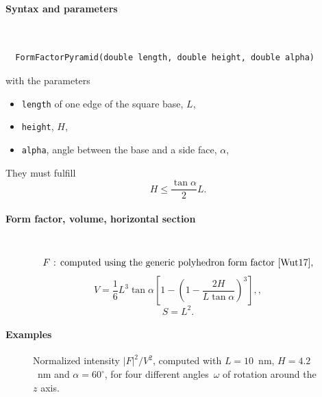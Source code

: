 \paragraph{Syntax and parameters}\strut\\[-2ex plus .2ex minus .2ex]
\begin{lstlisting}
  FormFactorPyramid(double length, double height, double alpha)
\end{lstlisting}
with the parameters
\begin{itemize}
\item \texttt{length} of one edge of the square base, $L$,
\item \texttt{height}, $H$,
\item \texttt{alpha}, angle between the base and a side face, $\alpha$,
\end{itemize}
They must fulfill
\begin{displaymath}
  H \le \frac{\tan\alpha}{2}L.
\end{displaymath}

\paragraph{Form factor, volume, horizontal section}\strut\\
\begin{equation*}
  F \text{~: computed using the generic polyhedron form factor~\cite{Wut17},}
\end{equation*}
\begin{equation*}
  V = \dfrac{1}{6}  L^3 \tan\alpha\left[ 1
             - \left(1 - \dfrac{2H}{L\tan\alpha}\right)^3 \right],,
\end{equation*}
\begin{equation*}
  S = L^2.
\end{equation*}

\paragraph{Examples}\strut

\begin{figure}[H]
\begin{center}
\end{center}
\caption{Normalized intensity $|F|^2/V^2$,
computed with $L=10$~nm, $H=4.2$~nm and $\alpha=60^{\circ}$,
for four different angles~$\omega$ of rotation around the $z$ axis.}
\end{figure}


